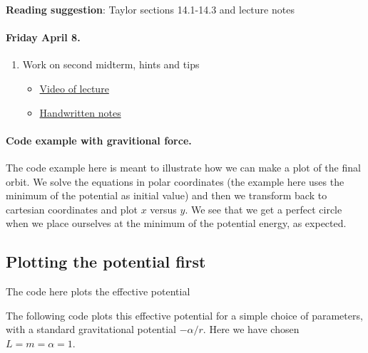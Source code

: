\documentclass[%
oneside,                 %
final,                   %
10pt]{article}
\begin{document}
\noindent
\textbf{Reading suggestion}: Taylor sections 14.1-14.3 and lecture notes

\paragraph{Friday April 8.}
\begin{enumerate}
\item Work on second midterm, hints and tips
\begin{itemize}

  \item \href{{https://youtu.be/tIO5OWGZ76c}}{Video of lecture}

  \item \href{{https://github.com/mhjensen/Physics321/blob/master/doc/HandWrittenNotes/Spring2022/NotesApril8.pdf}}{Handwritten notes}
\end{itemize}

\noindent
\end{enumerate}

\noindent
\paragraph{Code example with gravitional force.}
The code example here is meant to illustrate how we can make a plot of
the final orbit. We solve the equations in polar coordinates (the
example here uses the minimum of the potential as initial value) and
then we transform back to cartesian coordinates and plot $x$ versus
$y$. We see that we get a perfect circle when we place ourselves at
the minimum of the potential energy, as expected.

\subsection{Plotting the potential first}

The code here plots the effective potential

The following code plots this effective potential for a simple choice of parameters, with a standard gravitational potential $-\alpha/r$. Here we have chosen $L=m=\alpha=1$. 
\end{document}
